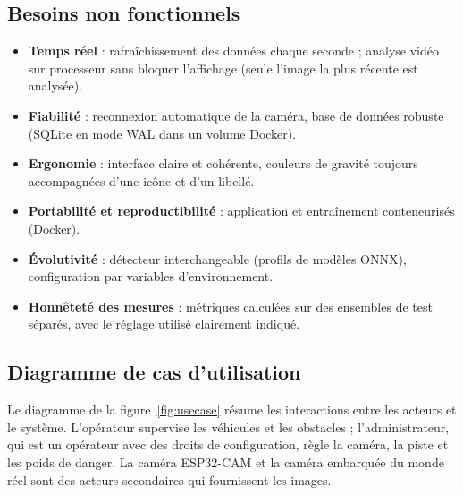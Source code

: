\subsection*{Besoins non fonctionnels}
\begin{itemize}
  \item \textbf{Temps réel} : rafraîchissement des données chaque seconde ; analyse vidéo sur processeur sans
        bloquer l'affichage (seule l'image la plus récente est analysée).
  \item \textbf{Fiabilité} : reconnexion automatique de la caméra, base de données robuste (SQLite en mode WAL dans
        un volume Docker).
  \item \textbf{Ergonomie} : interface claire et cohérente, couleurs de gravité toujours accompagnées d'une icône et
        d'un libellé.
  \item \textbf{Portabilité et reproductibilité} : application et entraînement conteneurisés (Docker).
  \item \textbf{Évolutivité} : détecteur interchangeable (profils de modèles ONNX), configuration par variables
        d'environnement.
  \item \textbf{Honnêteté des mesures} : métriques calculées sur des ensembles de test séparés, avec le réglage
        utilisé clairement indiqué.
\end{itemize}

\subsection*{Diagramme de cas d'utilisation}
Le diagramme de la figure~\ref{fig:usecase} résume les interactions entre les acteurs et le système. L'opérateur
supervise les véhicules et les obstacles ; l'administrateur, qui est un opérateur avec des droits de
configuration, règle la caméra, la piste et les poids de danger. La caméra ESP32-CAM et la caméra embarquée du
monde réel sont des acteurs secondaires qui fournissent les images.

